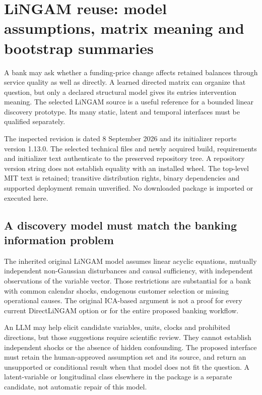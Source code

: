 \section{LiNGAM reuse: model assumptions, matrix meaning and bootstrap summaries}
\label{sec:exec24-lingam-reuse}

A bank may ask whether a funding-price change affects retained balances
through service quality as well as directly. A learned directed matrix
can organize that question, but only a declared structural model gives
its entries intervention meaning. The selected LiNGAM source is a useful
reference for a bounded linear discovery prototype. Its many static,
latent and temporal interfaces must be qualified separately.
\citep{exec24_lingam_source,exec24_lingam_choice}

The inspected revision is dated 8 September 2026 and its initializer
reports version 1.13.0. The selected technical files and newly acquired
build, requirements and initializer text authenticate to the preserved
repository tree. A repository version string does not establish equality
with an installed wheel. The top-level MIT text is retained; transitive
distribution rights, binary dependencies and supported deployment remain
unverified. No downloaded package is imported or executed here.
\citep{exec24_lingam_source}

\subsection{A discovery model must match the banking information problem}
The inherited original LiNGAM model assumes linear acyclic equations,
mutually independent non-Gaussian disturbances and causal sufficiency,
with independent observations of the variable vector. Those restrictions
are substantial for a bank with common calendar shocks, endogenous
customer selection or missing operational causes. The original ICA-based
argument is not a proof for every current DirectLiNGAM option or for the
entire proposed banking workflow.~\citep{exec13_pydisc_shimizu2006}

An LLM may help elicit candidate variables, units, clocks and prohibited
directions, but those suggestions require scientific review. They cannot
establish independent shocks or the absence of hidden confounding. The
proposed interface must retain the human-approved assumption set and its
source, and return an unsupported or conditional result when that model
does not fit the question. A latent-variable or longitudinal class elsewhere
in the package is a separate candidate, not automatic repair of this model.
\citep{exec24_lingam_choice}

